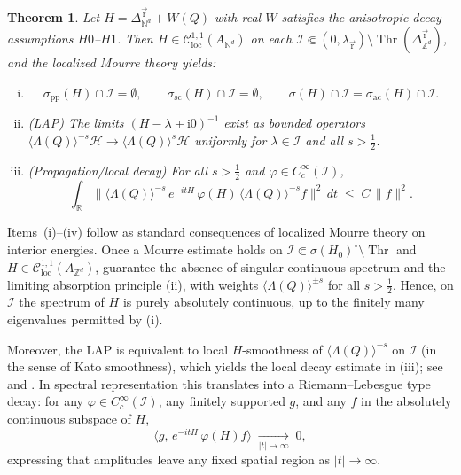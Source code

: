\documentclass[10pt]{amsart}
\newcommand{\Z}{{\mathbb{Z}}}
\newcommand{\1}{{\mathbb{I}}}
\newcommand{\Ic}{\mathcal{I}}
\newcommand{\Thr}{\operatorname{Thr}}
\numberwithin{equation}{section}
\newtheorem{theorem}{Theorem}[section]%
\begin{document}
\begin{theorem}\label{thm:LAP-transport-Nd}
Let $H=\Delta_{\mathbb{N}^d}^{\vec{\mathrm r}}+W(Q)$ with real $W$ satisfies the anisotropic decay assumptions \textbf{$H0$}--\textbf{$H1$}.
Then $H\in\mathcal{C}^{1,1}_{\mathrm{loc}}(A_{\mathbb{N}^d})$ on each $\Ic\Subset (0,\lambda_{\vec{\mathrm{r}}})\setminus \Thr(\Delta_{\mathbb{Z}^d}^{\vec{\mathrm{r}}})$, and the localized Mourre theory  yields:
\begin{enumerate}[(i)]
\item
\[
\sigma_{\mathrm{pp}}(H)\cap \Ic=\emptyset,\qquad
\sigma_{\mathrm{sc}}(H)\cap \Ic=\emptyset,\qquad
\sigma(H)\cap \Ic=\sigma_{\mathrm{ac}}(H)\cap \Ic.
\]
\item \textup{(LAP)} The limits $(H-\lambda\mp \mathrm{i}0)^{-1}$ exist as bounded operators
$\langle \Lambda(Q)\rangle^{-s}\mathcal{H}\to \langle \Lambda(Q)\rangle^{s}\mathcal{H}$ uniformly for $\lambda\in \Ic$ and all $s>\tfrac12$.
\item \textup{(Propagation/local decay)} For all $s>\tfrac12$ and $\varphi\in C_c^\infty(\Ic)$,
\[
\int_{\mathbb{R}}\big\|\langle \Lambda(Q)\rangle^{-s}\,e^{-itH}\,\varphi(H)\,\langle \Lambda(Q)\rangle^{-s} f\big\|^2\,dt
\;\le\; C\,\|f\|^2.
\]

\end{enumerate}
\end{theorem}
Items~(i)--(iv) follow as standard consequences of localized Mourre theory on interior energies.
Once a Mourre estimate holds on $\Ic\Subset\sigma(H_0)^\circ\setminus\Thr$ and $H\in\mathcal{C}^{1,1}_{\mathrm{loc}}(A_{\Z^d})$,
\cite[Thms.~7.4.1--7.4.2]{ABG} guarantee the absence of singular continuous spectrum and the limiting absorption principle
(ii), with weights $\langle \Lambda(Q)\rangle^{\pm s}$ for all $s>\tfrac12$.
Hence, on $\Ic$ the spectrum of $H$ is purely absolutely continuous, up to the finitely many eigenvalues permitted by (i).

Moreover, the LAP is equivalent to local $H$-smoothness of $\langle \Lambda(Q)\rangle^{-s}$ on $\Ic$
(in the sense of Kato smoothness), which yields the local decay estimate in (iii);
see \cite[Ch.~7]{ABG} and \cite[Section~VIII.C]{RS}.
In spectral representation this translates into a Riemann--Lebesgue type decay:
for any $\varphi\in C_c^\infty(\Ic)$, any finitely supported $g$, and any $f$ in the absolutely continuous subspace of $H$,
\[
\langle g,\,e^{-itH}\,\varphi(H)f\rangle \;\xrightarrow[|t|\to\infty]{}\; 0,
\]
expressing that amplitudes leave any fixed spatial region as $|t|\to\infty$.
\end{document}

